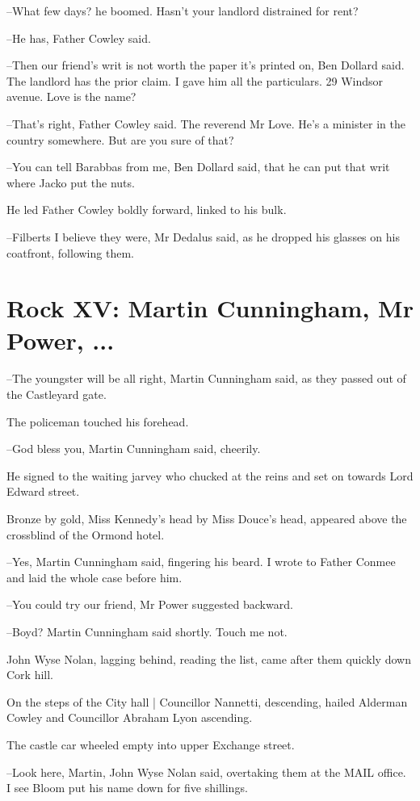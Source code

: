 --What few days?
he boomed.
Hasn't your landlord distrained for rent?

--He has,
Father Cowley said.

--Then our friend's writ is not worth the paper it's printed on,
Ben
Dollard said.
The landlord has the prior claim.
I gave him all the
particulars.
29 Windsor avenue.
Love is the name?

--That's right,
Father Cowley said.
The reverend Mr Love.
He's a minister
in the country somewhere.
But are you sure of that?

--You can tell Barabbas from me,
Ben Dollard said,
that he can put that writ where Jacko put the nuts.

He led Father Cowley boldly forward,
linked to his bulk.

--Filberts I believe they were,
Mr Dedalus said,
as he dropped his
glasses on his coatfront,
following them.


\section*{Rock XV: Martin Cunningham, Mr Power, ...}


--The youngster will be all right,
Martin Cunningham said,
as they passed
out of the Castleyard gate.

The policeman touched his forehead.

--God bless you,
Martin Cunningham said, cheerily.

He signed to the waiting jarvey
who chucked at the reins and set on towards Lord Edward street.

Bronze by gold,
Miss Kennedy's head by Miss Douce's head,
appeared above
the crossblind of the Ormond hotel.

--Yes,
Martin Cunningham said,
fingering his beard.
I wrote to Father
Conmee and laid the whole case before him.

--You could try our friend,
Mr Power suggested backward.

--Boyd?
Martin Cunningham said shortly.
Touch me not.

John Wyse Nolan, lagging behind, reading the list,
came after them
quickly down Cork hill.

On the steps of the City hall |
Councillor Nannetti, descending,
hailed
Alderman Cowley and Councillor Abraham Lyon ascending.

The castle car wheeled empty into upper Exchange street.

--Look here, Martin,
John Wyse Nolan said,
overtaking them at the MAIL
office.
I see Bloom put his name down for five shillings.

